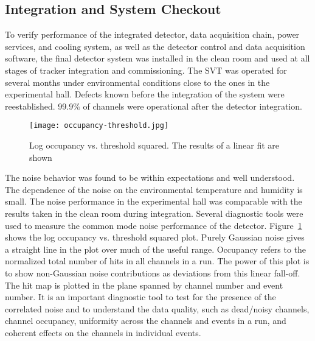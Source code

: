 %
%

%

\subsection{Integration and System Checkout}

To verify performance of the integrated detector, data acquisition chain, power services, and cooling system, as well as the detector control and data acquisition software, the final detector system was installed in the clean room and used at all stages of tracker integration and commissioning. The SVT was operated for several months under environmental conditions close to the ones in the experimental hall. Defects known before the integration of the system were reestablished. 99.9$\%$ of channels were operational after the detector integration. 
 
\begin{figure}[hbt] 
\centering 
\texttt{[image: occupancy-threshold.jpg]}
\caption{Log occupancy vs. threshold squared. The results of a linear fit are shown}
\label{fig:occupancy-threshold}
\end{figure}

The noise behavior was found to be within expectations and well understood. The dependence of the noise on the environmental temperature and humidity is small. The noise performance in the experimental hall was comparable with the results taken in the clean room during integration. Several diagnostic tools were used to measure the common mode noise performance of the detector. Figure~\ref{fig:occupancy-threshold} shows the log occupancy vs. threshold squared plot. Purely Gaussian noise gives a straight line in the plot over much of the useful range. Occupancy refers to the normalized total number of hits in all channels in a run. The power of this plot is to show non-Gaussian noise contributions as deviations from this linear fall-off. The hit map is plotted in the plane spanned by channel number and event number. It is an important diagnostic tool to test for the presence of the correlated noise and to understand the data quality, such as dead/noisy channels, channel occupancy, uniformity across the channels and events in a run, and coherent effects on the channels in individual events.

